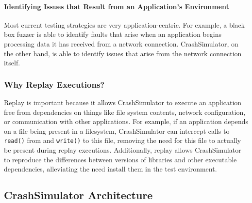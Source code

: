 \paragraph{Identifying Issues that Result from an Application's Environment}

Most current testing strategies are very application-centric.  For
example, a black box fuzzer is able to identify faults that arise when
an application begins processing data it has received from a network
connection. CrashSimulator, on the other hand, is able to identify
issues that arise from the network connection itself.

\subsubsection{Why Replay Executions?}

Replay is important because it allows CrashSimulator to execute an
application free from dependencies on things like file system contents,
network configuration, or communication with other applications.  For
example, if an application depends on a file being present in a filesystem,
CrashSimulator can intercept calls to {\tt read()} from and {\tt write()} to
this file, removing the need for this file to actually be present during
replay executions. Additionally, replay allows CrashSimulator to reproduce
the differences between versions of libraries and other executable
dependencies, alleviating the need install them in the test environment.



    \subsection{CrashSimulator Architecture}
        
